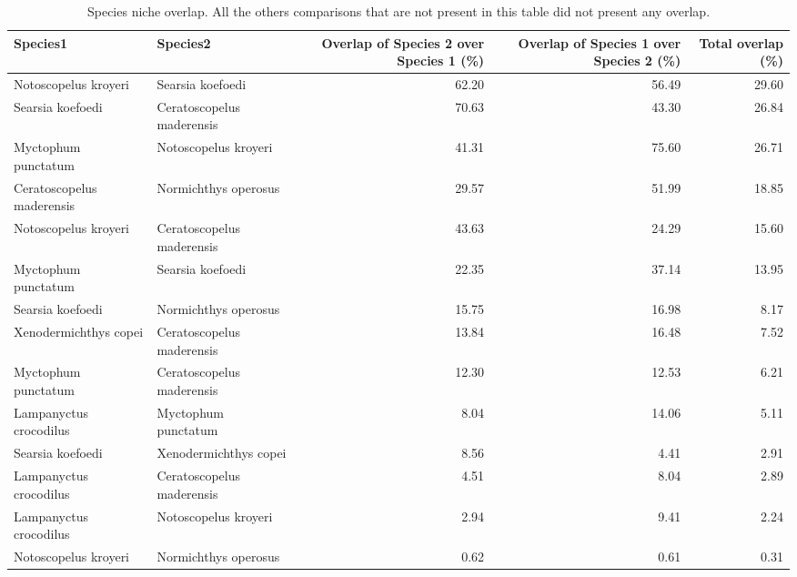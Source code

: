 \begin{table}[ht]
\centering
\caption{Species niche overlap. All the others comparisons that are not present in this table did not present any overlap.}
\label{table:ell_ovlp}
\begin{adjustbox}{max width=1.1\textwidth,center}
\begin{tabular}{llrrr}
  \hline
Species1 & Species2 & Overlap of Species 2 over Species 1 (\%) & Overlap of Species 1 over Species 2 (\%) & Total overlap (\%)\\ 
  \hline
Notoscopelus kroyeri & Searsia koefoedi & 62.20 & 56.49 & 29.60 \\ 
  Searsia koefoedi & Ceratoscopelus maderensis & 70.63 & 43.30 & 26.84 \\ 
  Myctophum punctatum & Notoscopelus kroyeri & 41.31 & 75.60 & 26.71 \\ 
  Ceratoscopelus maderensis & Normichthys operosus & 29.57 & 51.99 & 18.85 \\ 
  Notoscopelus kroyeri & Ceratoscopelus maderensis & 43.63 & 24.29 & 15.60 \\ 
  Myctophum punctatum & Searsia koefoedi & 22.35 & 37.14 & 13.95 \\ 
  Searsia koefoedi & Normichthys operosus & 15.75 & 16.98 & 8.17 \\ 
  Xenodermichthys copei & Ceratoscopelus maderensis & 13.84 & 16.48 & 7.52 \\ 
  Myctophum punctatum & Ceratoscopelus maderensis & 12.30 & 12.53 & 6.21 \\ 
  Lampanyctus crocodilus & Myctophum punctatum & 8.04 & 14.06 & 5.11 \\ 
  Searsia koefoedi & Xenodermichthys copei & 8.56 & 4.41 & 2.91 \\ 
  Lampanyctus crocodilus & Ceratoscopelus maderensis & 4.51 & 8.04 & 2.89 \\ 
  Lampanyctus crocodilus & Notoscopelus kroyeri & 2.94 & 9.41 & 2.24 \\ 
  Notoscopelus kroyeri & Normichthys operosus & 0.62 & 0.61 & 0.31 \\ 
   \hline
\end{tabular}
\end{adjustbox}
\end{table}


